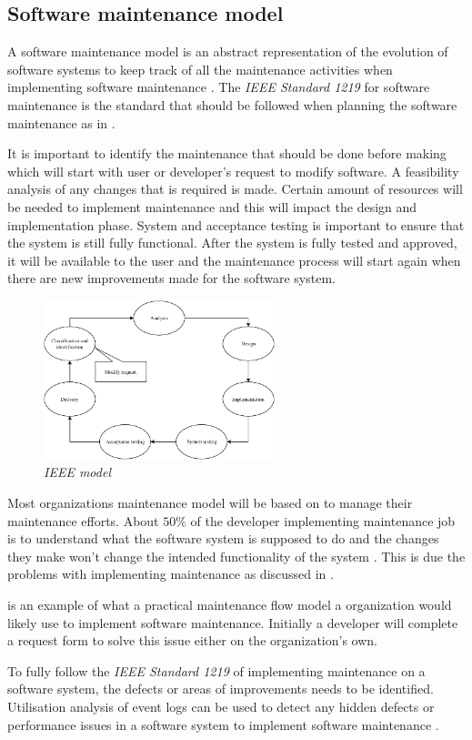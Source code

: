 \subsection{Software maintenance model}
A software maintenance model is an abstract representation of the evolution of software systems to keep track of all the maintenance activities when implementing software maintenance \cite{Ren2011}. The \textit{IEEE Standard 1219} for software maintenance is the standard that should be followed when planning the software maintenance as in .\par It is important to identify the maintenance that should be done before making which will start with user or developer's request to modify software. A feasibility analysis of any changes that is required is made. Certain amount of resources will be needed to implement maintenance and this will impact the design and implementation phase. System and acceptance testing is important to ensure that the system is still fully functional. After the system is fully tested and approved, it will be available to the user and the maintenance process will start again when there are new improvements made for the software system.

\begin{figure}[!htb] %
	\centering %
	\includegraphics[width=0.6\textwidth]{Images/Chapter1/Background/IEEE_Model/IEEE_Model.pdf}
	\caption[IEEE model]
	{\textit{IEEE model \cite{Ren2011}}} \label{fig:CH1_IEEE_Model}
\end{figure}

Most organizations maintenance model will be based on  to manage their maintenance efforts. About $50\%$ of the developer implementing maintenance job is to understand what the software system is supposed to do and the changes they make won't change the intended functionality of the system \cite{Tang2010}. This is due the problems with implementing maintenance as discussed in .\par {} is an example of what a practical maintenance flow model a organization would likely use to implement software maintenance. Initially a developer will complete a request form to solve this issue either on the organization's own. \par To fully follow the \textit{IEEE Standard 1219} of implementing maintenance on a software system, the defects or areas of improvements needs to be identified. Utilisation analysis of event logs can be used to detect any hidden defects or performance issues in a software system to implement software maintenance \cite{Cinque2013, Rong2018a, Levin2019}.

